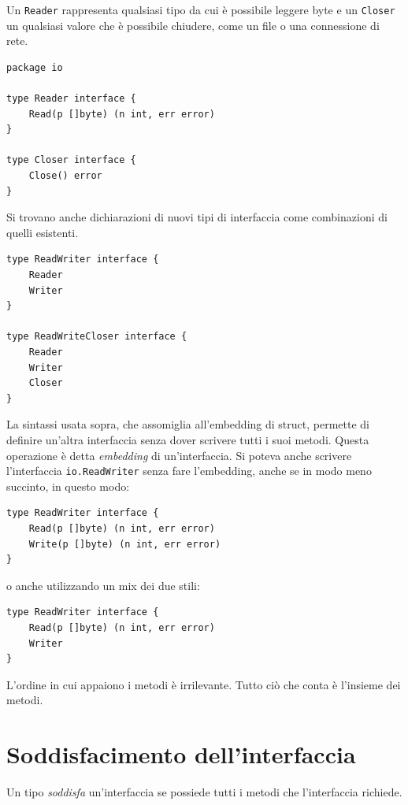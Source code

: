 Un \verb|Reader| rappresenta qualsiasi tipo da cui è possibile leggere byte e un \verb|Closer| un qualsiasi valore che è possibile chiudere, come un file o una connessione di rete.
\begin{lstlisting}[frame=single, label={lst:lstlisting6-2.1}]
package io

type Reader interface {
    Read(p []byte) (n int, err error)
}

type Closer interface {
    Close() error
}
\end{lstlisting}
Si trovano anche dichiarazioni di nuovi tipi di interfaccia come combinazioni di quelli esistenti.
\begin{lstlisting}[frame=single, label={lst:lstlisting6-2.2}]
type ReadWriter interface {
    Reader
    Writer
}

type ReadWriteCloser interface {
    Reader
    Writer
    Closer
}
\end{lstlisting}
La sintassi usata sopra, che assomiglia all'embedding di struct, permette di definire un'altra interfaccia senza dover scrivere tutti i suoi metodi.
Questa operazione è detta \textit{embedding} di un'interfaccia.
Si poteva anche scrivere l'interfaccia \verb|io.ReadWriter| senza fare l'embedding, anche se in modo meno succinto, in questo modo:
\begin{lstlisting}[frame=single, label={lst:lstlisting6-2.3}]
type ReadWriter interface {
    Read(p []byte) (n int, err error)
    Write(p []byte) (n int, err error)
}
\end{lstlisting}
o anche utilizzando un mix dei due stili:
\begin{lstlisting}[frame=single, label={lst:lstlisting6-2.4}]
type ReadWriter interface {
    Read(p []byte) (n int, err error)
    Writer
}
\end{lstlisting}
L'ordine in cui appaiono i metodi è irrilevante.
Tutto ciò che conta è l'insieme dei metodi.


\section{Soddisfacimento dell'interfaccia}
\label{sec:soddisfacimento_interfaccia}%
Un tipo \textit{soddisfa} un'interfaccia se possiede tutti i metodi che l'interfaccia richiede.

